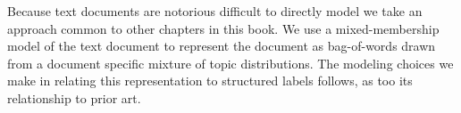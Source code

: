 %
%
%
%
%
%
Because text documents are notorious difficult to directly model we take an approach common to other chapters in this book.  We use a mixed-membership model of the text document to represent the document as bag-of-words drawn from a document specific mixture of topic distributions.   The modeling choices we make in relating this representation to structured labels follows, as too its relationship to prior art.



